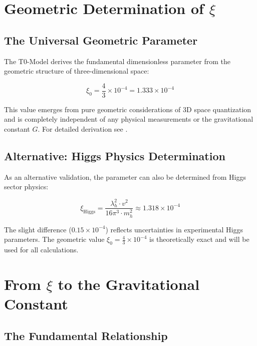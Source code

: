 \documentclass[12pt,a4paper]{article}
\begin{document}
	\section{Geometric Determination of $\xi$}
	
	\subsection{The Universal Geometric Parameter}
	
	The T0-Model derives the fundamental dimensionless parameter from the geometric structure of three-dimensional space:
	
	\begin{equation}
		\xi_0 = \frac{4}{3} \times 10^{-4} = 1.333 \times 10^{-4}
	\end{equation}
	
	\begin{tcolorbox}[colback=green!5!white,colframe=green!75!black,title=Geometric Foundation]
		This value emerges from pure geometric considerations of 3D space quantization and is completely independent of any physical measurements or the gravitational constant $G$. For detailed derivation see \cite{pascher_geometry_2024}.
	\end{tcolorbox}
	
	\subsection{Alternative: Higgs Physics Determination}
	
	As an alternative validation, the parameter can also be determined from Higgs sector physics:
	
	\begin{equation}
		\xi_{\text{Higgs}} = \frac{\lambda_h^2 \cdot v^2}{16\pi^3 \cdot m_h^2} \approx 1.318 \times 10^{-4}
	\end{equation}
	
	The slight difference ($0.15 \times 10^{-4}$) reflects uncertainties in experimental Higgs parameters. The geometric value $\xi_0 = \frac{4}{3} \times 10^{-4}$ is theoretically exact and will be used for all calculations.
	
	\section{From $\xi$ to the Gravitational Constant}
	
	\subsection{The Fundamental Relationship}
	
\end{document}
